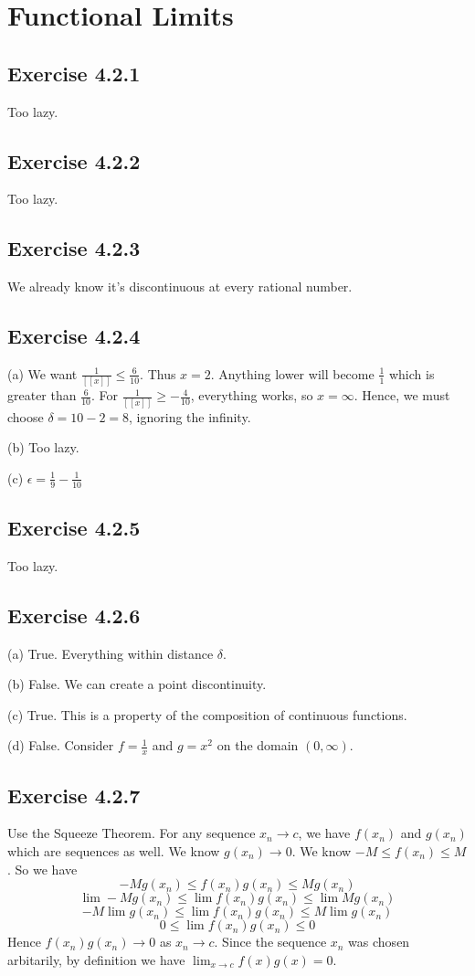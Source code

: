 \documentclass{book}
\begin{document}
\section{Functional Limits}

\subsection*{Exercise 4.2.1}
Too lazy.

\subsection*{Exercise 4.2.2}
Too lazy.

\subsection*{Exercise 4.2.3}
We already know it's discontinuous at every rational number.

\subsection*{Exercise 4.2.4}
(a)
We want $\frac{1}{[[x]]} \leq \frac{6}{10}$. Thus $x = 2$. Anything lower will become $\frac{1}{1}$ which is greater than $\frac{6}{10}$. For $\frac{1}{[[x]]} \geq -\frac{4}{10}$, everything works, so $x = \infty$. Hence, we must choose $\delta = 10 - 2 = 8$, ignoring the infinity.

\noindent
(b)
Too lazy.

\noindent
(c)
$\epsilon = \frac{1}{9} - \frac{1}{10}$

\subsection*{Exercise 4.2.5}
Too lazy.

\subsection*{Exercise 4.2.6}
(a)
True. Everything within distance $\delta$.

\noindent
(b)
False. We can create a point discontinuity.

\noindent
(c)
True. This is a property of the composition of continuous functions.

\noindent
(d)
False. Consider $f = \frac{1}{x}$ and $g = x^2$ on the domain $(0, \infty)$.

\subsection*{Exercise 4.2.7}
Use the Squeeze Theorem. For any sequence $x_n \rightarrow c$, we have $f(x_n)$ and $g(x_n)$ which are sequences as well. We know $g(x_n) \rightarrow 0$. We know $-M \leq f(x_n) \leq M$. So we have
$$-Mg(x_n) \leq f(x_n)g(x_n) \leq Mg(x_n)$$
$$\lim -Mg(x_n) \leq \lim f(x_n)g(x_n) \leq \lim Mg(x_n)$$
$$-M\lim g(x_n) \leq \lim f(x_n)g(x_n) \leq M\lim g(x_n)$$
$$0 \leq \lim f(x_n)g(x_n) \leq 0$$
Hence $f(x_n)g(x_n) \rightarrow 0$ as $x_n \rightarrow c$. Since the sequence $x_n$ was chosen arbitarily, by definition we have $\lim_{x \rightarrow c} f(x)g(x) = 0$.
\end{document}
